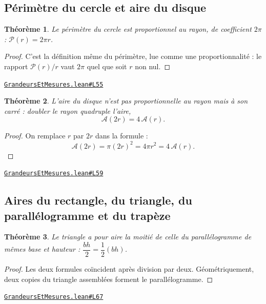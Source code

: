 \documentclass[11pt,a4paper]{article}
\theoremstyle{definition}
\theoremstyle{plain}
\newtheorem{theoreme}{Théorème}
\newcommand{\source}[2]{\par\smallskip\noindent\hfill{\footnotesize\href{#1}{\texttt{#2}}}\par\smallskip}
\begin{document}
\subsection{Périmètre du cercle et aire du disque}

\begin{theoreme}
Le périmètre du cercle est proportionnel au rayon, de coefficient $2\pi$ :
$\mathcal{P}(r) = 2\pi r$.
\end{theoreme}

\begin{proof}
C'est la définition même du périmètre, lue comme une proportionnalité : le rapport
$\mathcal{P}(r)/r$ vaut $2\pi$ quel que soit $r$ non nul.
\end{proof}
\source{https://github.com/Commutator-IO/learn-lean/blob/main/cours/01-college/04-grandeurs-et-mesures/GrandeursEtMesures.lean\#L55}{GrandeursEtMesures.lean\#L55}

\begin{theoreme}
L'aire du disque n'est pas proportionnelle au rayon mais à son carré : doubler le
rayon quadruple l'aire,
\[ \mathcal{A}(2r) = 4\,\mathcal{A}(r) . \]
\end{theoreme}

\begin{proof}
On remplace $r$ par $2r$ dans la formule :
\[ \mathcal{A}(2r) = \pi (2r)^2 = 4\pi r^2 = 4\,\mathcal{A}(r) . \]
\end{proof}
\source{https://github.com/Commutator-IO/learn-lean/blob/main/cours/01-college/04-grandeurs-et-mesures/GrandeursEtMesures.lean\#L59}{GrandeursEtMesures.lean\#L59}

\subsection{Aires du rectangle, du triangle, du parallélogramme et du trapèze}

\begin{theoreme}
Le triangle a pour aire la moitié de celle du parallélogramme de mêmes base et
hauteur : $\dfrac{bh}{2} = \dfrac{1}{2}(bh)$.
\end{theoreme}

\begin{proof}
Les deux formules coïncident après division par deux. Géométriquement, deux copies du
triangle assemblées forment le parallélogramme.
\end{proof}
\source{https://github.com/Commutator-IO/learn-lean/blob/main/cours/01-college/04-grandeurs-et-mesures/GrandeursEtMesures.lean\#L67}{GrandeursEtMesures.lean\#L67}
\end{document}
